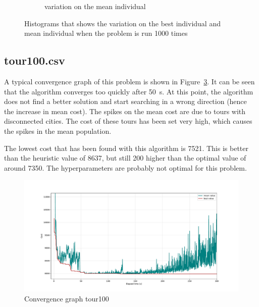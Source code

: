 \documentclass[a4paper,10pt]{article}
\newcommand{\ReplaceMe}[1]{{\color{blue}#1}}
\begin{document}
\begin{figure}[H]
\begin{subfigure}{0.5\linewidth}
      \caption{variation on the mean individual}
      \label{fig:variationmean}
    \end{subfigure}
    \caption{Histograms that shows the variation on the best individual and mean individual when the problem is run 1000 times}
    \label{fig:variations}
  \end{figure}

\subsection{tour100.csv}
A typical convergence graph of this problem is shown in Figure~\ref{fig:convergence100}. It can be seen that the algorithm converges too quickly after \SI{50}{\second}. At this point, the algorithm does not find a better solution and start searching in a wrong direction (hence the increase in mean cost). The spikes on the mean cost are due to tours with disconnected cities. The cost of these tours has been set very high, which causes the spikes in the mean population.

The lowest cost that has been found with this algorithm is 7521. This is better than the heuristic value of 8637, but still 200 higher than the optimal value of around 7350. The hyperparameters are probably not optimal for this problem.
\begin{figure}[H]
  \centering
  \includegraphics[width=.8\linewidth]{img/convergence100.pdf}
  \caption{Convergence graph tour100}
  \label{fig:convergence100}
\end{figure}



\end{document}
